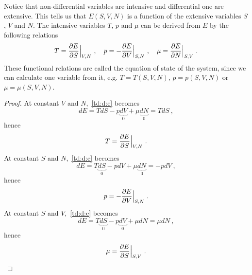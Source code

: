     Notice that non-differential variables are intensive and differential one are extensive. This tells us that $E(S, V, N)$ is a function of the extensive variables $S$, $V$ and $N$. The intensive variables $T$, $p$ and $\mu$ can be derived from $E$ by the following relations 
    \begin{equation}\label{td:es:e}
        T = \frac{\partial E}{\partial S} \Big \vert_{V,N} ~, \quad p = - \frac{\partial E}{\partial V} \Big \vert_{S,N} ~, \quad \mu = \frac{\partial E}{\partial N} \Big \vert_{S,V} ~. 
    \end{equation}
    These functional relations are called the equation of state of the system, since we can calculate one variable from it, e.g. $T = T(S,V,N)$, $p = p(S,V,N)$ or $\mu = \mu(S,V,N)$. 
    \begin{proof}
        At constant $V$ and $N$,~\eqref{td:d:e} becomes
        \begin{equation*}
            dE = TdS - p \underbrace{dV}_0 + \mu \underbrace{dN}_0 = TdS ~,
        \end{equation*}
        hence 
        \begin{equation*}
            T = \frac{\partial E}{\partial S} \Big \vert_{V,N} ~.
        \end{equation*}
        At constant $S$ and $N$,~\eqref{td:d:e} becomes
        \begin{equation*}
            dE = T\underbrace{dS}_0 - p dV + \mu \underbrace{dN}_0 = - p dV ~,
        \end{equation*}
        hence 
        \begin{equation*}
            p = - \frac{\partial E}{\partial V} \Big \vert_{S,N} ~.
        \end{equation*}
        At constant $S$ and $V$,~\eqref{td:d:e} becomes
        \begin{equation*}
            dE = T\underbrace{dS}_0 - p \underbrace{dV}_0 + \mu dN = \mu dN ~,
        \end{equation*}
        hence 
        \begin{equation*}
            \mu = \frac{\partial E}{\partial S} \Big \vert_{S,V} ~.
        \end{equation*}
    \end{proof}

